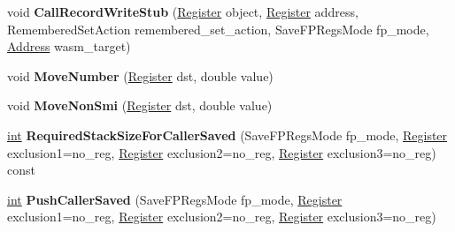 \begin{DoxyCompactItemize}
\item 
\mbox{\label{classv8_1_1internal_1_1TurboAssembler_a2bc1271b1999cb2ee3784489515931b6}} 
void {\bfseries Call\+Record\+Write\+Stub} (\mbox{\hyperlink{classv8_1_1internal_1_1Register}{Register}} object, \mbox{\hyperlink{classv8_1_1internal_1_1Register}{Register}} address, Remembered\+Set\+Action remembered\+\_\+set\+\_\+action, Save\+F\+P\+Regs\+Mode fp\+\_\+mode, \mbox{\hyperlink{classuintptr__t}{Address}} wasm\+\_\+target)
\item 
\mbox{\label{classv8_1_1internal_1_1TurboAssembler_ae3e097851f37a0f387abebfa65f0b727}} 
void {\bfseries Move\+Number} (\mbox{\hyperlink{classv8_1_1internal_1_1Register}{Register}} dst, double value)
\item 
\mbox{\label{classv8_1_1internal_1_1TurboAssembler_a7c6d056e83c7fbc38d74636fb8b55915}} 
void {\bfseries Move\+Non\+Smi} (\mbox{\hyperlink{classv8_1_1internal_1_1Register}{Register}} dst, double value)
\item 
\mbox{\label{classv8_1_1internal_1_1TurboAssembler_ade281f6d328e2fdd51963e91bda13365}} 
\mbox{\hyperlink{classint}{int}} {\bfseries Required\+Stack\+Size\+For\+Caller\+Saved} (Save\+F\+P\+Regs\+Mode fp\+\_\+mode, \mbox{\hyperlink{classv8_1_1internal_1_1Register}{Register}} exclusion1=no\+\_\+reg, \mbox{\hyperlink{classv8_1_1internal_1_1Register}{Register}} exclusion2=no\+\_\+reg, \mbox{\hyperlink{classv8_1_1internal_1_1Register}{Register}} exclusion3=no\+\_\+reg) const
\item 
\mbox{\label{classv8_1_1internal_1_1TurboAssembler_a05799e0b139129becdabdf8af8e18810}} 
\mbox{\hyperlink{classint}{int}} {\bfseries Push\+Caller\+Saved} (Save\+F\+P\+Regs\+Mode fp\+\_\+mode, \mbox{\hyperlink{classv8_1_1internal_1_1Register}{Register}} exclusion1=no\+\_\+reg, \mbox{\hyperlink{classv8_1_1internal_1_1Register}{Register}} exclusion2=no\+\_\+reg, \mbox{\hyperlink{classv8_1_1internal_1_1Register}{Register}} exclusion3=no\+\_\+reg)
\item 
\mbox{\label{classv8_1_1internal_1_1TurboAssembler_a5f104f3d3c969b063fb4d1dfdc643b1c}} 

\end{DoxyCompactItemize}
